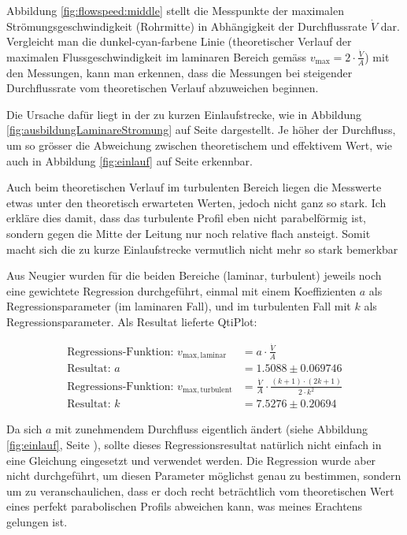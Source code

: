 \begin{samepage}
Abbildung  \ref{fig:flowspeed:middle}  stellt  die  Messpunkte  der  maximalen
Str\"omungsgeschwindigkeit  (Rohrmitte) in  Abh\"angigkeit der  Durchflussrate
$\dot{V}$ dar.   Vergleicht man  die dunkel-cyan-farbene  Linie (theoretischer
Verlauf  der  maximalen  Flussgeschwindigkeit im  laminaren  Bereich  gem\"ass
$v_{\mathrm{max}} =  2 \cdot \frac{\dot{V}}{A}$)  mit den Messungen,  kann man
erkennen, dass  die Messungen bei steigender  Durchflussrate vom theoretischen
Verlauf abzuweichen beginnen.

Die    Ursache   daf\"ur    liegt   in    der   zu    kurzen   Einlaufstrecke,
wie    in    Abbildung    \ref{fig:ausbildungLaminareStromung}    auf    Seite
\pageref{fig:ausbildungLaminareStromung}    dargestellt. Je     h\"oher    der
Durchfluss,  um  so  gr\"osser   die  Abweichung  zwischen  theoretischem  und
effektivem   Wert,  wie   auch  in   Abbildung  \ref{fig:einlauf}   auf  Seite
\pageref{fig:einlauf} erkennbar.

Auch beim  theoretischen Verlauf im  turbulenten Bereich liegen  die Messwerte
etwas unter den theoretisch erwarteten Werten, jedoch nicht ganz so stark. Ich
erkl\"are dies  damit, dass das  turbulente Profil eben  nicht parabelf\"ormig
ist,  sondern   gegen  die   Mitte  der  Leitung   nur  noch   relative  flach
ansteigt. Somit macht sich  die zu kurze Einlaufstrecke  vermutlich nicht mehr
so stark bemerkbar

Aus Neugier wurden f\"ur die beiden Bereiche (laminar, turbulent) jeweils noch
eine gewichtete Regression durchgef\"uhrt,  einmal mit einem Koeffizienten $a$
als Regressionsparameter (im laminaren Fall),  und im turbulenten Fall mit $k$
als Regressionsparameter. Als Resultat lieferte QtiPlot:

\begin{align}
    \label{eq:rohrmitte:regressionresults}
    \text{Regressions-Funktion: } v_{\mathrm{max, laminar}}     &= a \cdot \frac{\dot{V}}{A} \\
    \text{Resultat: }                                                  a &= 1.5088 \pm 0.069746 \\
    \text{Regressions-Funktion: } v_{\mathrm{max, turbulent}} &= \frac{\dot{V}}{A} \cdot \frac{(k + 1) \cdot (2k + 1)}{2 \cdot k^2} \\
    \text{Resultat: }                                                  k &= 7.5276 \pm 0.20694
\end{align}
\end{samepage}

Da sich  $a$ mit zunehmendem  Durchfluss eigentlich \"andert  (siehe Abbildung
\ref{fig:einlauf}, Seite \pageref{fig:einlauf}\footnotemark[2]), sollte dieses
Regressionsresultat nat\"urlich nicht einfach in eine Gleichung eingesetzt und
verwendet werden. Die  Regression wurde  aber nicht durchgef\"uhrt,  um diesen
Parameter  m\"oglichst genau  zu  bestimmen, sondern  um zu  veranschaulichen,
dass  er  doch  recht  betr\"achtlich vom  theoretischen  Wert  eines  perfekt
parabolischen Profils abweichen kann, was meines Erachtens gelungen ist.

